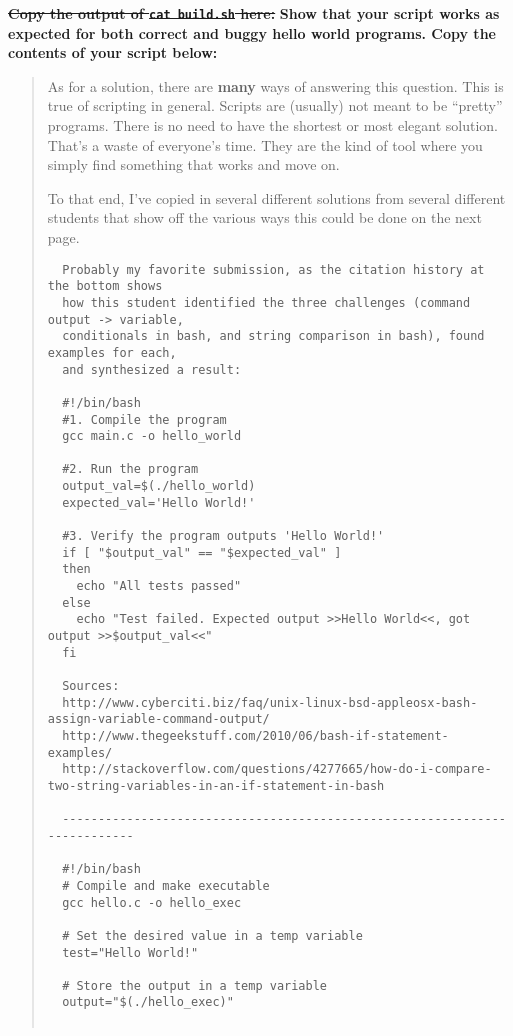 \documentclass{article}
\begin{document}
\st{\textbf{Copy the output of \texttt{cat build.sh} here:}}
\textbf{\color{red} Show that your script works as expected for both correct
and buggy hello world programs. Copy the contents of your script below:}


\begin{quote}
  \color{violet}

  As for a solution, there are \textbf{many} ways of answering this question.
  This is true of scripting in general. Scripts are (usually) not meant to be
  ``pretty'' programs. There is no need to have the shortest or most elegant
  solution. That's a waste of everyone's time. They are the kind of tool where
  you simply find something that works and move on.

  To that end, I've copied in several different solutions from several
  different students that show off the various ways this could be done on the
  next page.

  \newpage
  \lstset{tabsize=1}
  \lstset{basicstyle=\footnotesize\ttfamily}
  \begin{lstlisting}
  Probably my favorite submission, as the citation history at the bottom shows
  how this student identified the three challenges (command output -> variable,
  conditionals in bash, and string comparison in bash), found examples for each,
  and synthesized a result:

  #!/bin/bash
  #1. Compile the program
  gcc main.c -o hello_world

  #2. Run the program
  output_val=$(./hello_world)
  expected_val='Hello World!'

  #3. Verify the program outputs 'Hello World!'
  if [ "$output_val" == "$expected_val" ]
  then
    echo "All tests passed"
  else
    echo "Test failed. Expected output >>Hello World<<, got output >>$output_val<<"
  fi

  Sources:
  http://www.cyberciti.biz/faq/unix-linux-bsd-appleosx-bash-assign-variable-command-output/
  http://www.thegeekstuff.com/2010/06/bash-if-statement-examples/
  http://stackoverflow.com/questions/4277665/how-do-i-compare-two-string-variables-in-an-if-statement-in-bash

  --------------------------------------------------------------------------

  #!/bin/bash
  # Compile and make executable
  gcc hello.c -o hello_exec

  # Set the desired value in a temp variable
  test="Hello World!"

  # Store the output in a temp variable
  output="$(./hello_exec)"


\end{lstlisting}
\end{quote}
\end{document}
